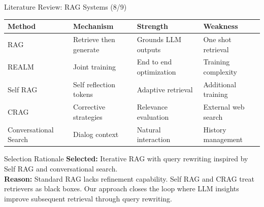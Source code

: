\documentclass[aspectratio=169,xcolor=dvipsnames]{beamer}
\begin{document}
\begin{frame}{Literature Review: RAG Systems (8/9)}
    \scriptsize
    \begin{table}
        \centering
        \renewcommand{\arraystretch}{1.1}
        \begin{tabular}{p{}|p{}|p{}|p{}}
        \toprule
        \textbf{Method} & \textbf{Mechanism} & \textbf{Strength} & \textbf{Weakness} \\
        \midrule
        RAG \cite{lewis2020retrieval} & Retrieve then generate & Grounds LLM outputs & One shot retrieval \\
        \midrule
        REALM \cite{guu2020retrieval} & Joint training & End to end optimization & Training complexity \\
        \midrule
        Self RAG \cite{asai2024self} & Self reflection tokens & Adaptive retrieval & Additional training \\
        \midrule
        CRAG \cite{yan2024corrective} & Corrective strategies & Relevance evaluation & External web search \\
        \midrule
        Conversational Search \cite{mo2024survey} & Dialog context & Natural interaction & History management \\
        \bottomrule
        \end{tabular}
    \end{table}
    
    \vspace{0.3em}
    \begin{block}{Selection Rationale}
        \textbf{Selected:} Iterative RAG with query rewriting inspired by Self RAG and conversational search. \\
        \textbf{Reason:} Standard RAG lacks refinement capability. Self RAG and CRAG treat retrievers as black boxes. Our approach closes the loop where LLM insights improve subsequent retrieval through query rewriting.
    \end{block}
\end{frame}
\end{document}
